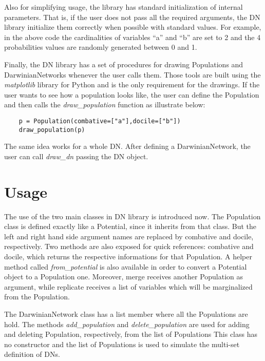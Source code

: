 Also for simplifying usage, the library has standard initialization of internal parameters.
That is, if the user does not pass all the required arguments, the DN library initialize them correctly when possible with standard values.
For example, in the above code the cardinalities of variables ``a'' and ``b'' are set to 2 and the 4 probabilities values are randomly generated between 0 and 1.

Finally, the DN library has a set of procedures for drawing Populations and DarwinianNetworks whenever the user calls them.
Those tools are built using the \emph{matplotlib} \cite{Hunter:2007} library for Python and is the only requirement for the drawings.
If the user wants to see how a population looks like, the user can define the Population and then calls the \emph{draw\_population} function as illustrate below:
\begin{verbatim}
    p = Population(combative=["a"],docile=["b"])
    draw_population(p)
\end{verbatim}
The same idea works for a whole DN.
After defining a DarwinianNetwork, the user can call \emph{draw\_dn} passing the DN object.

\section{Usage}
\label{sec:system:sec3}

The use of the two main classes in DN library is introduced now.
The Population class is defined exactly like a Potential, since it inherits from that class.
But the left and right hand side argument names are replaced by combative and docile, respectively.
Two methods are also exposed for quick references: combative and docile, which returns the respective informations for that Population.
A helper method called \emph{from\_potential} is also available in order to convert a Potential object to a Population one.
Moreover, merge receives another Population as argument, while replicate receives a list of variables which will be marginalized from the Population.

The DarwinianNetwork class has a list member where all the Populations are hold.
The methods \emph{add\_population} and \emph{delete\_population} are used for adding and deleting Population, respectively, from the list of Populations
This class has no constructor and the list of Populations is used to simulate the multi-set definition of DNs.
